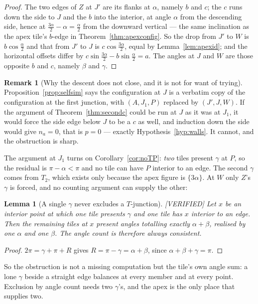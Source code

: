 \documentclass[11pt,reqno]{amsart}
\theoremstyle{plain}
\newtheorem{lemma}[theorem]{Lemma}
\theoremstyle{definition}
\newtheorem{remark}[theorem]{Remark}
\newcommand{\lab}[1]{\hfill\textnormal{\footnotesize\textsc{[#1]}}}
\begin{document}
\begin{proof}
The two edges of $Z$ at $J'$ are its flanks at $\alpha$, namely $b$ and $c$; the $c$ runs down the side
to $J$ and the $b$ into the interior, at angle $\alpha$ from the descending side, hence at
$\frac{3\alpha}{2}-\alpha=\frac{\alpha}{2}$ from the downward vertical --- the same inclination as the
apex tile's $b$-edge in Theorem~\ref{thm:apexconfig}. So the drop from $J'$ to $W$ is
$b\cos\frac{\alpha}{2}$ and that from $J'$ to $J$ is $c\cos\frac{3\alpha}{2}$, equal by
Lemma~\ref{lem:apexid}; and the horizontal offsets differ by
$c\sin\frac{3\alpha}{2}-b\sin\frac{\alpha}{2}=a$. The angles at $J$ and $W$ are those opposite $b$ and
$c$, namely $\beta$ and $\gamma$.
\end{proof}

\begin{remark}[Why the descent does not close, and it is not for want of trying]\label{rem:selfsim}
Proposition~\ref{prop:selfsim} says the configuration at $J$ is a verbatim copy of the configuration
at the first junction, with $(A,J_1,P)$ replaced by $(J',J,W)$. If the argument of
Theorem~\ref{thm:secondc} could be run at $J$ as it was at $J_1$, it would force the side edge below
$J$ to be a $c$ as well, and induction down the side would give $n_a=0$, that is $p=0$ --- exactly
Hypothesis~\ref{hyp:walls}. It cannot, and the obstruction is sharp.

The argument at $J_1$ turns on Corollary~\ref{cor:noTP}: \emph{two} tiles present $\gamma$ at $P$, so
the residual is $\pi-\alpha<\pi$ and no tile can have $P$ interior to an edge. The second $\gamma$
comes from $T_2$, which exists only because the apex figure is $\{3\alpha\}$. At $W$ only $Z$'s
$\gamma$ is forced, and no counting argument can supply the other:

\begin{lemma}[A single $\gamma$ never excludes a $T$-junction]\label{lem:onegamma}\lab{VERIFIED}
Let $x$ be an interior point at which one tile presents $\gamma$ and one tile has $x$ interior to an
edge. Then the remaining tiles at $x$ present angles totalling exactly $\alpha+\beta$, realised by one
$\alpha$ and one $\beta$. The angle count is therefore always consistent.
\end{lemma}

\begin{proof}
$2\pi=\gamma+\pi+R$ gives $R=\pi-\gamma=\alpha+\beta$, since $\alpha+\beta+\gamma=\pi$.
\end{proof}

So the obstruction is not a missing computation but the tile's own angle sum: a lone $\gamma$ beside a
straight edge balances at every member and at every point. Exclusion by angle count needs two
$\gamma$'s, and the apex is the only place that supplies two.


\end{remark}
\end{document}
